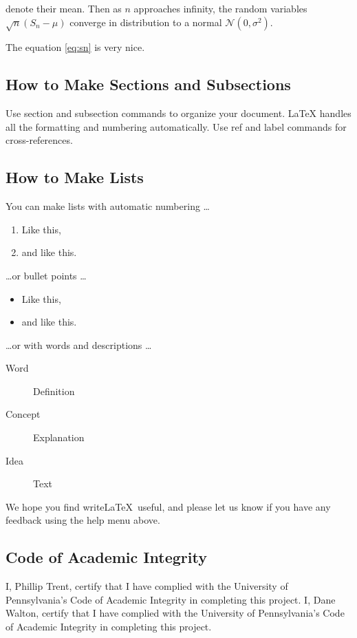 \documentclass[a4paper]{article}
\begin{document}
denote their mean. Then as $n$ approaches infinity, the random variables $\sqrt{n}(S_n - \mu)$ converge in distribution to a normal $\mathcal{N}(0, \sigma^2)$.

The equation \ref{eq:sn} is very nice.

\subsection{How to Make Sections and Subsections}

Use section and subsection commands to organize your document. \LaTeX{} handles all the formatting and numbering automatically. Use ref and label commands for cross-references.

\subsection{How to Make Lists}

You can make lists with automatic numbering \dots

\begin{enumerate}
\item Like this,
\item and like this.
\end{enumerate}
\dots or bullet points \dots
\begin{itemize}
\item Like this,
\item and like this.
\end{itemize}
\dots or with words and descriptions \dots
\begin{description}
\item[Word] Definition
\item[Concept] Explanation
\item[Idea] Text
\end{description}

We hope you find write\LaTeX\ useful, and please let us know if you have any feedback using the help menu above.


\subsection{Code of Academic Integrity}
I, Phillip Trent, certify that I have complied with the University of Pennsylvania’s Code of Academic Integrity in completing this project.
I, Dane Walton, certify that I have complied with the University of Pennsylvania’s Code of Academic Integrity in completing this project.
\end{document}
